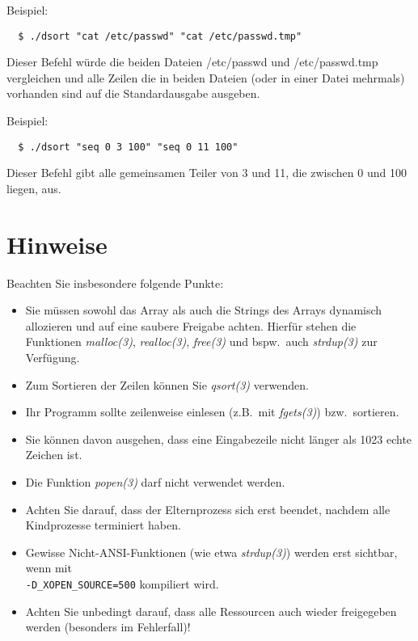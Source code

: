 \documentclass{article}
\begin{document}
Beispiel:
\begin{verbatim}
  $ ./dsort "cat /etc/passwd" "cat /etc/passwd.tmp"
\end{verbatim}

Dieser Befehl würde die beiden Dateien /etc/passwd und /etc/passwd.tmp
vergleichen und alle Zeilen die in beiden Dateien (oder in einer Datei
mehrmals) vorhanden sind auf die Standardausgabe ausgeben.

Beispiel:
\begin{verbatim}
  $ ./dsort "seq 0 3 100" "seq 0 11 100"
\end{verbatim}

Dieser Befehl gibt alle gemeinsamen Teiler von 3 und 11, die zwischen
0 und 100 liegen, aus.

\section*{Hinweise}

Beachten Sie insbesondere folgende Punkte:

\begin{itemize}
\item Sie müssen sowohl das Array als auch die Strings des Arrays
dynamisch allozieren und auf eine saubere Freigabe achten. Hierfür
stehen die Funktionen \emph{malloc(3)}, \emph{realloc(3)},
\emph{free(3)} und bspw.\ auch \emph{strdup(3)} zur Verfügung.
\item Zum Sortieren der Zeilen können Sie \emph{qsort(3)} verwenden.
\item Ihr Programm sollte zeilenweise einlesen (z.B.\ mit
\emph{fgets(3)}) bzw.\ sortieren.
\item Sie können davon ausgehen, dass eine Eingabezeile nicht länger
als 1023 echte Zeichen ist.
\item Die Funktion \emph{popen(3)} darf nicht verwendet werden.
\item Achten Sie darauf, dass der Elternprozess sich erst beendet,
nachdem alle Kindprozesse terminiert haben.
\item Gewisse Nicht-ANSI-Funktionen (wie etwa \emph{strdup(3)}) werden
erst sichtbar, wenn mit\\
\verb,-D_XOPEN_SOURCE=500, kompiliert wird.
\item Achten Sie unbedingt darauf, dass alle Ressourcen auch wieder
freigegeben werden (besonders im Fehlerfall)!
\end{itemize}
\end{document}
